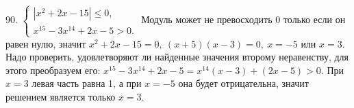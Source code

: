 90. $\begin{cases} |x^2+2x-15|\leqslant0,\\ x^{15}-3x^{14}+2x-5>0.\end{cases}$ Модуль может не превосходить 0 только если он равен нулю, значит $x^2+2x-15=0,\
(x+5)(x-3)=0,\ x=-5$ или $x=3.$ Надо проверить, удовлетворяют ли найденные значения второму неравенству, для этого преобразуем его: $x^{15}-3x^{14}+2x-5=x^{14}(x-3)+(2x-5)>0.$ При $x=3$ левая часть равна 1, а при $x=-5$ она будет отрицательна, значит решением является только $x=3.$\\
